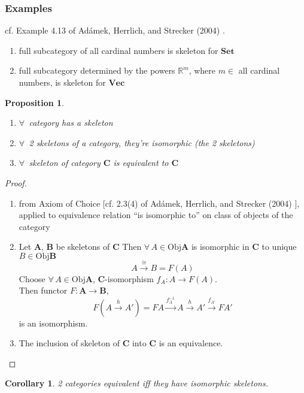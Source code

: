 \documentclass[twoside,landscape,10pt]{amsart}
\theoremstyle{plain}
\newtheorem{corollary}{Corollary}
\newtheorem{proposition}{Proposition}
\theoremstyle{definition}
\theoremstyle{remark}
\begin{document}
\begin{multicols*}{2}
\subsubsection{Examples} cf. Example 4.13 of Ad\'{a}mek, Herrlich, and Strecker (2004) \cite{AHS2004}.
\begin{enumerate}
\item full subcategory of all cardinal numbers is skeleton for $\mathbf{\text{Set}}$ 
\item full subcategory determined by the powers $\mathbb{R}^m$, where $m\in $ all cardinal numbers, is skeleton for $\mathbf{\text{Vec}}$
\end{enumerate}

\begin{proposition}
  \begin{enumerate}
\item $\forall \, $ category has a skeleton
\item $\forall \, $ 2 skeletons of a category, they're isomorphic (the 2 skeletons)
\item $\forall \, $ skeleton of category $\mathbf{C}$ is equivalent to $\mathbf{C}$
\end{enumerate}
\end{proposition}

\begin{proof}
\begin{enumerate}
  \item from Axiom of Choice [cf. 2.3(4) of Ad\'{a}mek, Herrlich, and Strecker (2004) \cite{AHS2004}], applied to equivalence relation ``is isomorphic to'' on class of objects of the category
  \item Let $\mathbf{A}$, $\mathbf{B}$ be skeletons of $\mathbf{C}$
Then $\forall \, A \in \text{Obj}\mathbf{A}$ is isomorphic in $\mathbf{C}$ to unique $B\in \text{Obj}\mathbf{B}$
\[
A \xrightarrow{ \cong} B = F(A)
\]
Choose $\forall \, A \in \text{Obj}\mathbf{A}$, $\mathbf{C}$-isomorphism $f_A: A \to F(A)$.  \\
Then functor $F:\mathbf{A} \to \mathbf{B}$,
\[
F(A\xrightarrow{h} A') = FA \xrightarrow{ f_A^{-1} }A \xrightarrow{h} A' \xrightarrow{f_{A'}} FA'
\]
is an isomorphism.  
  \item The inclusion of skeleton of $\mathbf{C}$ into $\mathbf{C}$ is an equivalence.  
\end{enumerate}
\end{proof}

\begin{corollary}
2 categories equivalent iff they have isomorphic skeletons.  
\end{corollary}


\end{multicols*}
\end{document}
